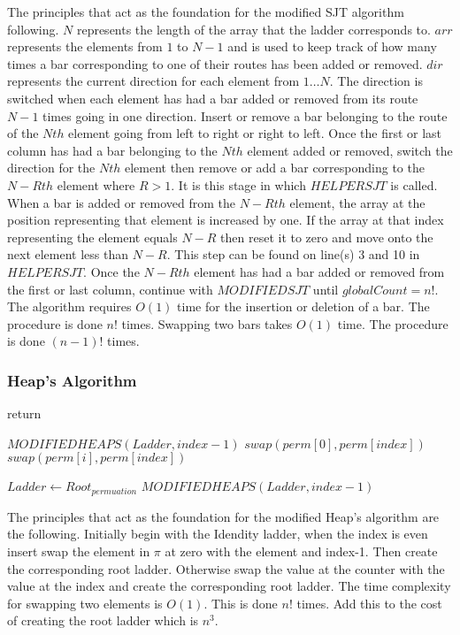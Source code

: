 The principles that act as the foundation for the modified SJT algorithm following. $N$ represents the length of the array that the ladder 
corresponds to. $arr$ represents the elements from $1$ to $N-1$ and is 
used to keep track of how many times a bar corresponding to one of their routes 
has been added or removed. $dir$ represents the current direction for 
each element from $1 \dots N$. The direction is switched when each element has had a 
bar added or removed from its route $N-1$ times going in one direction. 
Insert or remove a bar belonging to the route of the $Nth$ element going 
from left to right or right to left. Once the first or last column has had a bar 
belonging to the $Nth$ element added or removed, switch the direction for the $Nth$
element then remove or add a bar corresponding to the 
$N-Rth$ element where $R>1$. It is this stage in which $HELPERSJT$ is called. When a bar 
is added or removed from the $N-Rth$ element, the array at the position representing 
that element is increased by one. If the array at that index representing the element 
equals $N-R$ then reset it to zero and move onto the next element less than $N-R$. This step can be found 
on line(s) 3 and 10 in $HELPERSJT$. Once the $N-Rth$ element has had a bar added or removed from the first or last column, 
continue with $MODIFIEDSJT$ until $globalCount=n!$. The algorithm requires $O(1)$ time for the insertion or 
deletion of a bar. The procedure is done $n!$ times. Swapping two bars takes $O(1)$ time. The procedure is done 
$(n-1)!$ times.\pagebreak



\subsubsection{Heap's Algorithm}

\begin{algorithm}
  \begin{algorithmic}[1]
        \State return
      \EndIf
        
        $MODIFIEDHEAPS(Ladder, index-1)$
          \State $swap(perm[0], perm[index])$
        \Else 
          \State $swap(perm[i], perm[index])$
          
        \EndIf
        \State $Ladder \gets Root_{permuation}$
      \EndFor
        \State $MODIFIEDHEAPS(Ladder, index-1)$
      \EndIf
    \EndFunction
  \end{algorithmic}
\end{algorithm}
The principles that act as the foundation for the modified Heap's algorithm 
are the following. Initially begin with the Idendity ladder, when the index is 
even insert swap the element in $\pi$ at zero with the element and index-1. Then create the 
corresponding root ladder. Otherwise swap the value at the counter with the value at the 
index and create the corresponding root ladder. The time complexity for swapping two elements 
is $O(1)$. This is done $n!$ times. Add this to the cost of creating the root ladder which is 
$n^{3}$.\pagebreak



